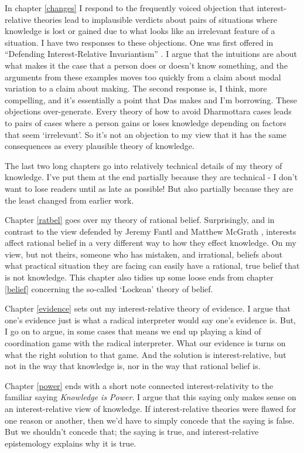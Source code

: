 \documentclass[
  11pt,
]{book}
\begin{document}
In chapter \ref{changes} I respond to the frequently voiced objection that interest-relative theories lead to implausible verdicts about pairs of situations where knowledge is lost or gained due to what looks like an irrelevant feature of a situation. I have two responses to these objections. One was first offered in ``Defending Interest-Relative Invariantism'' \citep{Weatherson2011-WEADIR}. I argue that the intuitions are about what makes it the case that a person does or doesn't know something, and the arguments from these examples moves too quickly from a claim about modal variation to a claim about making. The second response is, I think, more compelling, and it's essentially a point that Das makes and I'm borrowing. These objections over-generate. Every theory of how to avoid Dharmottara cases leads to pairs of cases where a person gains or loses knowledge depending on factors that seem `irrelevant'. So it's not an objection to my view that it has the same consequences as every plausible theory of knowledge.

The last two long chapters go into relatively technical details of my theory of knowledge. I've put them at the end partially because they are technical - I don't want to lose readers until as late as possible! But also partially because they are the least changed from earlier work.

Chapter \ref{ratbel} goes over my theory of rational belief. Surprisingly, and in contrast to the view defended by Jeremy Fantl and Matthew McGrath \citeyearpar{FantlMcGrath2009}, interests affect rational belief in a very different way to how they effect knowledge. On my view, but not theirs, someone who has mistaken, and irrational, beliefs about what practical situation they are facing can easily have a rational, true belief that is not knowledge. This chapter also tidies up some loose ends from chapter \ref{belief} concerning the so-called `Lockean' theory of belief.

Chapter \ref{evidence} sets out my interest-relative theory of evidence. I argue that one's evidence just is what a radical interpreter would say one's evidence is. But, I go on to argue, in some cases that means we end up playing a kind of coordination game with the radical interpreter. What our evidence is turns on what the right solution to that game. And the solution is interest-relative, but not in the way that knowledge is, nor in the way that rational belief is.

Chapter \ref{power} ends with a short note connected interest-relativity to the familiar saying \emph{Knowledge is Power}. I argue that this saying only makes sense on an interest-relative view of knowledge. If interest-relative theories were flawed for one reason or another, then we'd have to simply concede that the saying is false. But we shouldn't concede that; the saying is true, and interest-relative epistemology explains why it is true.
\end{document}
